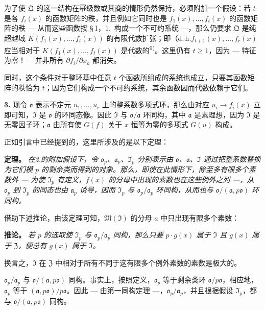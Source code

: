 \documentclass[11pt]{article}
\begin{document}
为了使 $\mathfrak{Q}$ 的这一结构在幂级数或其商的情形仍然保持，必须附加一个假设：若 $t$ 是各 $f_i(x)$ 的函数矩阵的秩，并且例如它同时也是 $f_1(x),\ldots,f_t(x)$ 的函数矩阵的秩 --- 从而这些函数按 \S\,1，1.\ 构成一个不可约系统 ---，那么仍要求 $\mathfrak{Q}$ 是纯超越域 $K(f_1(x),\ldots,f_t(x))$ 的有限代数扩张；即（d.\,h.\）$f_{t+1}(x),\ldots,f_r(x)$ 应当相对于 $K(f_1(x),\ldots,f_t(x))$ 是代数的\textsuperscript{9)}。这里仍有 $t \geq 1$，因为 --- 特征为零！--- 并非所有 $\partial f_i/\partial x_k$ 都消失。

同时，这个条件对于整环基中任意 $t$ 个函数所组成的系统也成立，只要其函数矩阵的秩恰为 $t$；因为它们构成一个不可约系统，其余函数因而代数依赖于它们。

\medskip\noindent\textbf{3.}
现令 $\mathfrak{o}$ 表示不定元 $u_1,\ldots,u_r$ 上的整系数多项式环，那么由对应 $u_i \to f_i(x)$ 立即可知，$\mathfrak{I}$ 是 $\mathfrak{o}$ 的环同态像。因此 $\mathfrak{I}$ 与 $\mathfrak{o}/\mathfrak{a}$ 环同构，其中 $\mathfrak{a}$ 是素理想，因为 $\mathfrak{I}$ 是无零因子环；$\mathfrak{a}$ 由所有使 $G(f)$ 关于 $x$ 恒等为零的多项式 $G(u)$ 构成。

正如引言中已经提到的，这里所涉及的是以下定理：

\medskip\noindent\textbf{定理。}
\textit{在2.的附加假设下，令 $\mathfrak{o}_p$、$\mathfrak{a}_p$、$\mathfrak{I}_p$ 分别表示由 $\mathfrak{o}$、$\mathfrak{a}$、$\mathfrak{I}$ 通过把整系数替换为它们模 $p$ 的剩余类而得到的对象。那么，即使在此情形下，除至多有限多个素数外 --- 为使 $\mathfrak{I}_p$ 有定义，$f(x)$ 的分母中出现的素数也在这些例外之列 ---，从 $\mathfrak{o}_p$ 到 $\mathfrak{I}_p$ 的同态也由 $\mathfrak{a}_p$ 诱导，因而 $\mathfrak{I}_p$ 与 $\mathfrak{o}_p/\mathfrak{a}_p$ 环同构，从而也与 $\mathfrak{o}/(\mathfrak{a}, p\mathfrak{o})$ 环同构。}

借助下述推论，由该定理可知，$\mathfrak{M}(\mathfrak{I})$ 的分母 $a$ 中只出现有限多个素数：

\medskip\noindent\textbf{推论。}
\textit{若 $p$ 的选取使 $\mathfrak{I}_p$ 与 $\mathfrak{o}_p/\mathfrak{a}_p$ 同构，那么只要 $p \cdot g(x)$ 属于 $\mathfrak{I}$ 且 $g(x)$ 属于 $\mathfrak{Z}$，便总有 $g(x)$ 属于 $\mathfrak{I}$。}

换言之，$\mathfrak{I}$ 在 $\mathfrak{Z}$ 中相对于所有不同于这有限多个例外素数的素数是极大的。

$\mathfrak{o}_p/\mathfrak{a}_p$ 与 $\mathfrak{o}/(\mathfrak{a}, p\mathfrak{o})$ 同构。事实上，按照定义，$\mathfrak{o}_p$ 等于剩余类环 $\mathfrak{o}/p\mathfrak{o}$，相应地，$\mathfrak{a}_p$ 等于 $(\mathfrak{a}, p\mathfrak{o})/p\mathfrak{o}$。因此 --- 由第一同构定理 ---，$\mathfrak{o}_p/\mathfrak{a}_p$，并且根据假设 $\mathfrak{I}_p$，都与 $\mathfrak{o}/(\mathfrak{a}, p\mathfrak{o})$ 同构。
\end{document}
